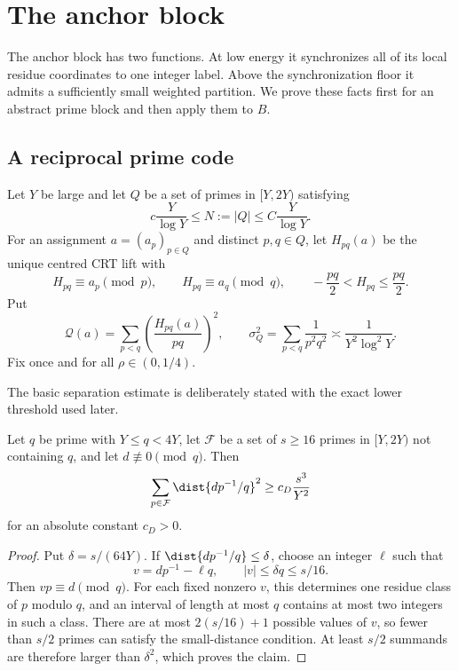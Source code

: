 \section{The anchor block}
\label{sec:top-anchor}

The anchor block has two functions.  At low energy it synchronizes all of its local residue coordinates to one integer label.  Above the synchronization floor it admits a sufficiently small weighted partition.  We prove these facts first for an abstract prime block and then apply them to $B$.

\subsection{A reciprocal prime code}

Let $Y$ be large and let $Q$ be a set of primes in $[Y,2Y)$ satisfying
\[
 c\frac{Y}{\log Y}\leq N:=|Q|\leq C\frac{Y}{\log Y}.
\]
For an assignment $a=(a_p)_{p\in Q}$ and distinct $p,q\in Q$, let $H_{pq}(a)$ be the unique centred CRT lift with
\[
 H_{pq}\equiv a_p\pmod p,
 \qquad
 H_{pq}\equiv a_q\pmod q,
 \qquad
 -\frac{pq}{2}<H_{pq}\leq\frac{pq}{2}.
\]
Put
\[
 \mathcal Q(a)=\sum_{p<q}\left(\frac{H_{pq}(a)}{pq}\right)^2,
 \qquad
 \sigma_Q^2=\sum_{p<q}\frac1{p^2q^2}\asymp\frac1{Y^2\log^2Y}.
\]
Fix once and for all $\rho\in(0,1/4)$.

The basic separation estimate is deliberately stated with the exact lower threshold used later.

\begin{lemma}
\label{lem:reciprocal-dispersion}
Let $q$ be prime with $Y\leq q<4Y$, let $\mathcal F$ be a set of $s\geq16$ primes in $[Y,2Y)$ not containing $q$, and let $d\not\equiv0\pmod q$.  Then
\[
 \sum_{p\in\mathcal F}\dist{d p^{-1}/q}^2
 \geq c_D\frac{s^3}{Y^2}
\]
for an absolute constant $c_D>0$.
\end{lemma}

\begin{proof}
Put $\delta=s/(64Y)$.  If $\dist{dp^{-1}/q}\leq\delta$, choose an integer $\ell$ such that
\[
 v=dp^{-1}-\ell q,
 \qquad
 |v|\leq\delta q\leq s/16.
\]
Then $vp\equiv d\pmod q$.  For each fixed nonzero $v$, this determines one residue class of $p$ modulo $q$, and an interval of length at most $q$ contains at most two integers in such a class.  There are at most $2(s/16)+1$ possible values of $v$, so fewer than $s/2$ primes can satisfy the small-distance condition.  At least $s/2$ summands are therefore larger than $\delta^2$, which proves the claim.
\end{proof}

